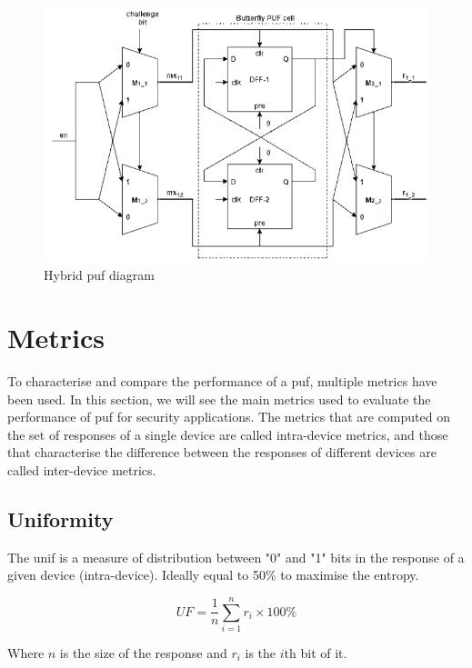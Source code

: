 \begin{figure}[H]
    \centering
    \includegraphics[width=\linewidth]{images/hybrid.png}
    \caption{Hybrid \acrshort{puf} diagram \cite{devika_fpga_2022}}
    \label{fig:HYBRID}
\end{figure}

\newpage
\section{Metrics}

To characterise and compare the performance of a \acrshort{puf}, multiple metrics have been used. In this section, we will see the main metrics used to evaluate the performance of \acrshort{puf} for security applications. The metrics that are computed on the set of responses of a single device are called intra-device metrics, and those that characterise the difference between the responses of different devices are called inter-device metrics.

\subsection{Uniformity}

The \acrfull{unif} is a measure of distribution between "0" and "1" bits in the response of a given device (intra-device). Ideally equal to 50\% to maximise the entropy.

\begin{equation}
    UF = \frac{1}{n} \sum_{i=1}^{n} r_i \times 100\%
\end{equation}

Where $n$ is the size of the response and $r_i$ is the $i$th bit of it.

